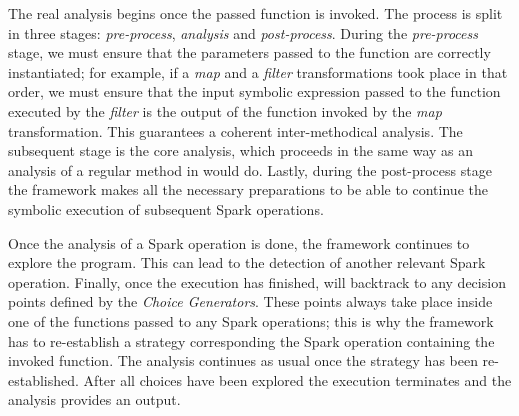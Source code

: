 The real analysis begins once the passed function is invoked. The process is split in three stages: \textit{pre-process}, \textit{analysis} and \textit{post-process}. During the \textit{pre-process} stage, we must ensure that the parameters passed to the function are correctly instantiated; for example, if a \textit{map} and a \textit{filter} transformations took place in that order, we must ensure that the input symbolic expression passed to the function executed by the \textit{filter} is the output of the function invoked by the \textit{map} transformation. This guarantees a coherent inter-methodical analysis. The subsequent stage is the core analysis, which proceeds in the same way as an analysis of a regular method in \spf would do. Lastly, during the post-process stage the framework makes all the necessary preparations to be able to continue the symbolic execution of subsequent Spark operations.

Once the analysis of a Spark operation is done, the framework continues to explore the program. This can lead to the detection of another relevant Spark operation. Finally, once the execution has finished, \jpf will backtrack to any decision points defined by the \textit{Choice Generators}. These points always take place inside one of the functions passed to any Spark operations; this is why the framework has to re-establish a strategy corresponding the Spark operation containing the invoked function. The analysis continues as usual once the strategy has been re-established. After all choices have been explored the execution terminates and the analysis provides an output.

